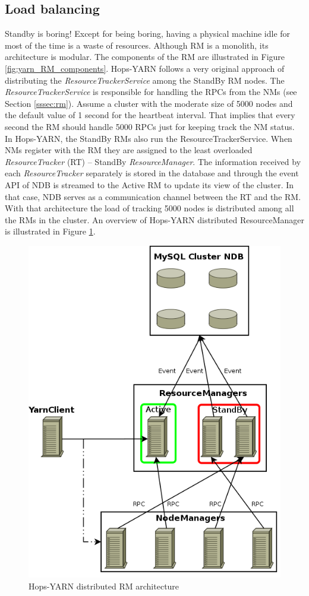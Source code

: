 \subsection{Load balancing}
\label{ssec:hops_yarn_load_balance}
Standby is boring! Except for being boring, having a physical machine
idle for most of the time is a waste of resources. Although RM is a
monolith, its architecture is modular. The components of the RM are illustrated in
Figure \ref{fig:yarn_RM_components}. Hops-YARN follows a very original
approach of distributing the \emph{ResourceTrackerService} among the
StandBy RM nodes. The \emph{ResourceTrackerService} is responsible for
handling the RPCs from the NMs (see Section \ref{sssec:rm}). Assume a
cluster with the moderate size of 5000 nodes and the default value of 1
second for the heartbeat interval. That implies that every second the
RM should handle 5000 RPCs just for keeping track the NM status. In
Hops-YARN, the StandBy RMs also run the
ResourceTrackerService. When NMs register with the RM they are
assigned to the least overloaded \emph{ResourceTracker} (RT) -- StandBy
\emph{ResourceManager}. The information received by each
\emph{ResourceTracker} separately is stored in the
database and through the event API of NDB is streamed to the Active
RM to update its view of the cluster. In that case, NDB serves as a
communication channel between the RT and the RM. With that
architecture the load of tracking 5000 nodes is distributed among all
the RMs in the cluster. An overview of Hops-YARN distributed
ResourceManager is illustrated in Figure \ref{fig:hopsyarn_dist_rm}.

\begin{figure}
\centering
\includegraphics[scale=0.5]{resources/images/Background/hopsyarn_arch_overview.png}
\caption{Hops-YARN distributed RM architecture}
\label{fig:hopsyarn_dist_rm}
\end{figure}